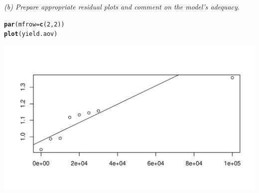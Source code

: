 \documentclass[a4paper]{article}\usepackage{graphicx, color}
\makeatletter
\def\maxwidth{ %
  \ifdim\Gin@nat@width>\linewidth
    \linewidth
  \else
    \Gin@nat@width
  \fi
}
\newcommand{\hlfunctioncall}[1]{\textcolor[rgb]{0.501960784313725,0,0.329411764705882}{\textbf{#1}}}%
\newenvironment{kframe}{%
 \def\at@end@of@kframe{}%
 \ifinner\ifhmode%
  \def\at@end@of@kframe{\end{minipage}}%
  \begin{minipage}{\columnwidth}%
 \fi\fi%
 \def\FrameCommand##1{\hskip\@totalleftmargin \hskip-\fboxsep
 \colorbox{shadecolor}{##1}\hskip-\fboxsep
     \hskip-\linewidth \hskip-\@totalleftmargin \hskip\columnwidth}%
 \MakeFramed {\advance\hsize-\width
   \@totalleftmargin\z@ \linewidth\hsize
   \@setminipage}}%
 {\par\unskip\endMakeFramed%
 \at@end@of@kframe}
\newenvironment{knitrout}{}{} %
\makeatother
\begin{document}
\vspace{2 mm}
\textit{(b) Prepare appropriate residual plots and comment on the model's adequacy.}\\
\begin{knitrout}
\color{fgcolor}\begin{kframe}
\begin{alltt}
\hlfunctioncall{par}(mfrow = \hlfunctioncall{c}(2, 2))
\hlfunctioncall{plot}(yield.aov)
\end{alltt}
\end{kframe}
\includegraphics[width=\maxwidth]{figure/unnamed-chunk-3} 

\end{knitrout}
\end{document}
